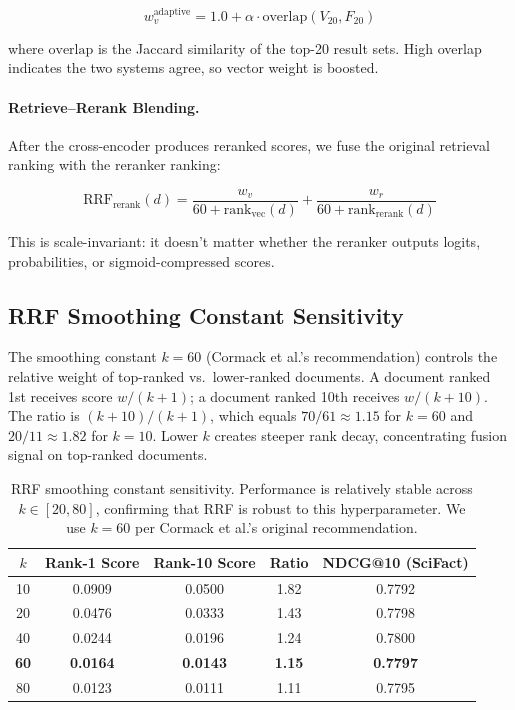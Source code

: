 \documentclass[11pt]{article}
\begin{document}
\begin{equation}
  w_v^{\text{adaptive}} = 1.0 + \alpha \cdot \text{overlap}(V_{20}, F_{20})
\end{equation}

where $\text{overlap}$ is the Jaccard similarity of the top-20 result sets. High
overlap indicates the two systems agree, so vector weight is boosted.

\paragraph{Retrieve--Rerank Blending.}
After the cross-encoder produces reranked scores, we fuse the original retrieval
ranking with the reranker ranking:

\begin{equation}
  \text{RRF}_{\text{rerank}}(d) = \frac{w_v}{60 + \text{rank}_{\text{vec}}(d)}
    + \frac{w_r}{60 + \text{rank}_{\text{rerank}}(d)}
\end{equation}

This is scale-invariant: it doesn't matter whether the reranker outputs logits,
probabilities, or sigmoid-compressed scores.

\subsection{RRF Smoothing Constant Sensitivity}

The smoothing constant $k=60$ (Cormack et al.'s recommendation) controls the relative
weight of top-ranked vs.\ lower-ranked documents. A document ranked 1st receives score
$w/(k+1)$; a document ranked 10th receives $w/(k+10)$. The ratio is $(k+10)/(k+1)$,
which equals $70/61 \approx 1.15$ for $k=60$ and $20/11 \approx 1.82$ for $k=10$.
Lower $k$ creates steeper rank decay, concentrating fusion signal on top-ranked
documents.

\begin{table}[H]
\centering
\small
\begin{tabular}{ccccc}
\toprule
$k$ & Rank-1 Score & Rank-10 Score & Ratio & NDCG@10 (SciFact) \\
\midrule
10 & 0.0909 & 0.0500 & 1.82 & 0.7792 \\
20 & 0.0476 & 0.0333 & 1.43 & 0.7798 \\
40 & 0.0244 & 0.0196 & 1.24 & 0.7800 \\
\textbf{60} & \textbf{0.0164} & \textbf{0.0143} & \textbf{1.15} & \textbf{0.7797} \\
80 & 0.0123 & 0.0111 & 1.11 & 0.7795 \\
\bottomrule
\end{tabular}
\caption{RRF smoothing constant sensitivity. Performance is relatively stable across
$k \in [20, 80]$, confirming that RRF is robust to this hyperparameter. We use $k=60$
per Cormack et al.'s original recommendation.}
\label{tab:rrf-k}
\end{table}
\end{document}
